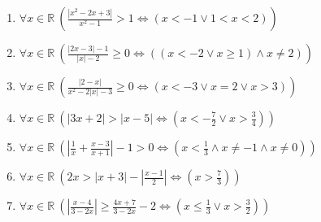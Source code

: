 \documentclass[11pt,a4paper]{article}
\begin{document}
\begin{enumerate}
\item $\displaystyle \forall x \in \mathbb{R}\ \left( \frac{\left|x^{2} - 2x + 3\right|}{x^{2} - 1} > 1 \iff \left( x < -1 \lor 1 < x < 2 \right) \right)$
\item $\displaystyle \forall x \in \mathbb{R}\ \left( \frac{\left|2x - 3\right| - 1}{\left|x\right| - 2} \ge 0 \iff \left( (x < -2 \lor x \ge 1) \land x \neq 2 \right) \right)$
\item $\displaystyle \forall x \in \mathbb{R}\ \left( \frac{\left|2 - x\right|}{x^{2} - 2\left|x\right| - 3} \ge 0 \iff \left( x < -3 \lor x = 2 \lor x > 3 \right) \right)$
\item $\displaystyle \forall x \in \mathbb{R}\ \left( \left|3x + 2\right| > \left|x - 5\right| \iff \left( x < -\frac{7}{2} \lor x > \frac{3}{4} \right) \right)$
\item $\displaystyle \forall x \in \mathbb{R}\ \left( \left|\frac{1}{x} + \frac{x - 3}{x + 1}\right| - 1 > 0 \iff \left( x < \frac{1}{3} \land x \neq -1 \land x \neq 0 \right) \right)$
\item $\displaystyle \forall x \in \mathbb{R}\ \left( 2x > \left|x + 3\right| - \left|\frac{x - 1}{2}\right| \iff \left( x > \frac{7}{3} \right) \right)$
\item $\displaystyle \forall x \in \mathbb{R}\ \left( \left|\frac{x - 4}{3 - 2x}\right| \ge \frac{4x + 7}{3 - 2x} - 2 \iff \left( x \le \frac{1}{3} \lor x > \frac{3}{2} \right) \right)$
\end{enumerate}
\end{document}

